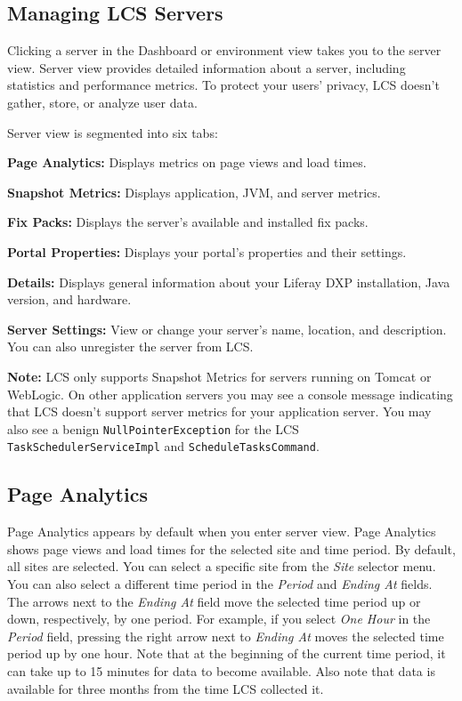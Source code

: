\subsection{Managing LCS Servers}\label{managing-lcs-servers}

Clicking a server in the Dashboard or environment view takes you to the
server view. Server view provides detailed information about a server,
including statistics and performance metrics. To protect your users'
privacy, LCS doesn't gather, store, or analyze user data.

Server view is segmented into six tabs:

\textbf{Page Analytics:} Displays metrics on page views and load times.

\textbf{Snapshot Metrics:} Displays application, JVM, and server
metrics.

\textbf{Fix Packs:} Displays the server's available and installed fix
packs.

\textbf{Portal Properties:} Displays your portal's properties and their
settings.

\textbf{Details:} Displays general information about your Liferay DXP
installation, Java version, and hardware.

\textbf{Server Settings:} View or change your server's name, location,
and description. You can also unregister the server from LCS.

\noindent\hrulefill

\textbf{Note:} LCS only supports Snapshot Metrics for servers running on
Tomcat or WebLogic. On other application servers you may see a console
message indicating that LCS doesn't support server metrics for your
application server. You may also see a benign
\texttt{NullPointerException} for the LCS
\texttt{TaskSchedulerServiceImpl} and \texttt{ScheduleTasksCommand}.

\noindent\hrulefill

\subsection{Page Analytics}\label{page-analytics}

Page Analytics appears by default when you enter server view. Page
Analytics shows page views and load times for the selected site and time
period. By default, all sites are selected. You can select a specific
site from the \emph{Site} selector menu. You can also select a different
time period in the \emph{Period} and \emph{Ending At} fields. The arrows
next to the \emph{Ending At} field move the selected time period up or
down, respectively, by one period. For example, if you select \emph{One
Hour} in the \emph{Period} field, pressing the right arrow next to
\emph{Ending At} moves the selected time period up by one hour. Note
that at the beginning of the current time period, it can take up to 15
minutes for data to become available. Also note that data is available
for three months from the time LCS collected it.

